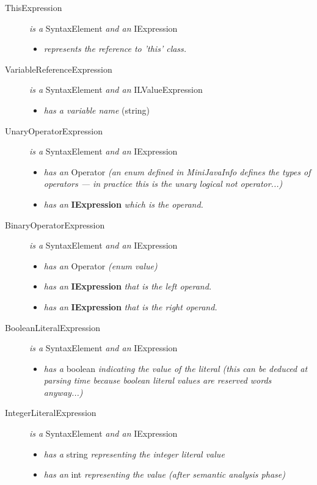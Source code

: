 \documentclass[a4paper,11pt]{article}
\begin{document}
\begin{description}
\begin{itemize}
      \end{itemize}
    \item[ThisExpression] \emph{is a} SyntaxElement \emph{and an} IExpression
      \begin{itemize}
        \item \emph{represents the reference to 'this' class.}
      \end{itemize}
    \item[VariableReferenceExpression] \emph{is a} SyntaxElement \emph{and an} ILValueExpression
      \begin{itemize}
        \item \emph{has a variable name} (string)
      \end{itemize}
    \item[UnaryOperatorExpression] \emph{is a} SyntaxElement \emph{and an} IExpression
      \begin{itemize}
        \item \emph{has an} Operator \emph{(an enum defined in MiniJavaInfo defines the types of operators --- in practice this is the unary logical not operator...)}
        \item \emph{has an} \textbf{IExpression} \emph{which is the operand.}
      \end{itemize}
    \item[BinaryOperatorExpression] \emph{is a} SyntaxElement \emph{and an} IExpression
      \begin{itemize}
        \item \emph{has an} Operator \emph{(enum value)}
        \item \emph{has an} \textbf{IExpression} \emph{that is the left operand.}
        \item \emph{has an} \textbf{IExpression} \emph{that is the right operand.}
      \end{itemize}
    \item[BooleanLiteralExpression] \emph{is a} SyntaxElement \emph{and an} IExpression
      \begin{itemize}
        \item \emph{has a} boolean \emph{indicating the value of the literal (this can be deduced at parsing time because boolean literal values are reserved words anyway...)}
      \end{itemize}
    \item[IntegerLiteralExpression] \emph{is a} SyntaxElement \emph{and an} IExpression
      \begin{itemize}
        \item \emph{has a} string \emph{representing the integer literal value}
        \item \emph{has an} int \emph{representing the value (after semantic analysis phase)}
      \end{itemize}
\end{description}
\end{document}
